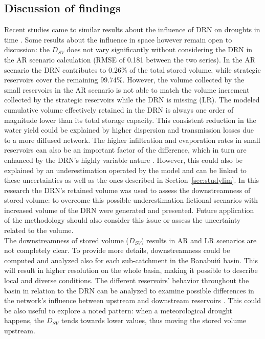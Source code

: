 \documentclass[draft]{agujournal2019}
\begin{document}
\subsection{Discussion of findings}
Recent studies came to similar results about the influence of DRN on droughts in time \cite{Rabelo2021,HvanLangen2021,RibeiroNeto2022}. Some results about the influence in space however remain open to discussion: the $D_{SV}$ does not vary significantly without considering the DRN in the AR scenario calculation (RMSE of 0.181 between the two series). In the AR scenario the DRN contributes to 0.26\% of the total stored volume, while strategic reservoirs cover the remaining 99.74\%. However, the volume collected by the small reservoirs in the AR scenario is not able to match the volume increment collected by the strategic reservoirs while the DRN is missing (LR). The modeled cumulative volume effectively retained in the DRN is always one order of magnitude lower than its total storage capacity. This consistent reduction in the water yield could be explained by higher dispersion and transmission losses due to a more diffused network. The higher infiltration and evaporation rates in small reservoirs can also be an important factor of the difference, which in turn are enhanced by the DRN’s highly variable nature \cite{Malveira2012}. However, this could also be explained by an underestimation operated by the model and can be linked to these uncertainties as well as the ones described in Section~\ref{sec:studylim}. In this research the DRN’s retained volume was used to assess the downstreamness of stored volume: to overcome this possible underestimation fictional scenarios with increased volume of the DRN were generated and presented. Future application of the methodology should also consider this issue or assess the uncertainty related to the volume.\\
The downstreamness of stored volume ($D_{SV}$) results in AR and LR scenarios are not completely clear. To provide more details, downstreamness could be computed and analyzed also for each sub-catchment in the Banabuiú basin. This will result in higher resolution on the whole basin, making it possible to describe local and diverse conditions. The different reservoirs’ behavior throughout the basin in relation to the DRN can be analyzed to examine possible differences in the network’s influence between upstream and downstream reservoirs \cite{HvanLangen2021}. This could be also useful to explore a noted pattern: when a meteorological drought happens, the $D_{SV}$ tends towards lower values, thus moving the stored volume upstream.
\end{document}
